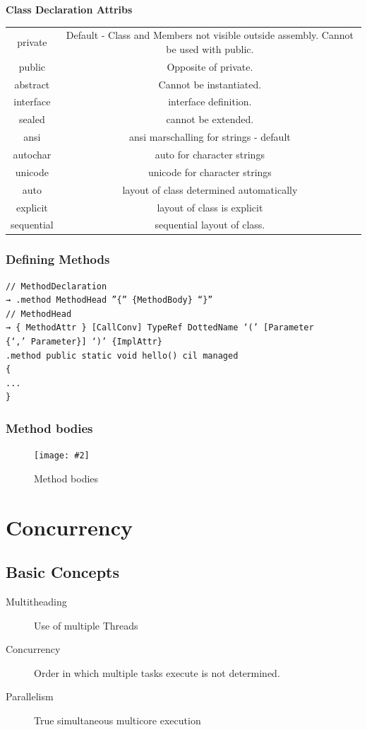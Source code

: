 \documentclass[a4paper,10pt]{scrartcl}
\newcommand{\pic}[2][Figure]{
  \begin{figure}[h!]
   \centering
   \texttt{[image: \#2]}
   \caption{{#1}}
  \end{figure}
}
\begin{document}
\textbf{Class Declaration Attribs}
\begin{tabular}{c c}
private & Default - Class and Members not visible outside assembly. Cannot be used with public. \\
public & Opposite of private. \\
abstract & Cannot be instantiated. \\
interface & interface definition. \\
sealed & cannot be extended. \\
ansi & ansi marschalling for strings - default \\
autochar & auto for character strings \\
unicode & unicode for character strings \\
auto & layout of class determined automatically \\
explicit & layout of class is explicit \\
sequential & sequential layout of class. \\
\end{tabular}

\subsubsection{Defining Methods}
\begin{lstlisting}
// MethodDeclaration
→ .method MethodHead ”{” {MethodBody} “}”
// MethodHead
→ { MethodAttr } [CallConv] TypeRef DottedName ‘(’ [Parameter
{‘,’ Parameter}] ‘)’ {ImplAttr}
.method public static void hello() cil managed
{
...
}

\end{lstlisting}

\subsubsection{Method bodies}
\pic[Method bodies]{methbod.png}

\section{Concurrency}

\subsection{Basic Concepts}
\begin{description}
 \item [Multitheading] Use of multiple Threads
 \item [Concurrency] Order in which multiple tasks execute is not determined.
 \item [Parallelism] True simultaneous multicore execution
\end{description}
\end{document}
